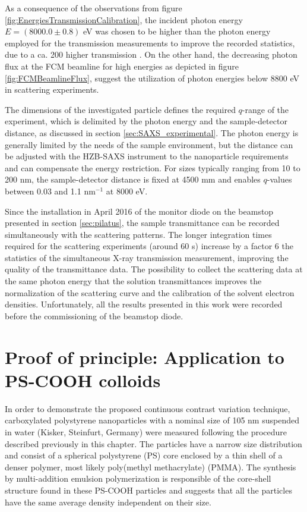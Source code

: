 As a consequence of the observations from figure \ref{fig:EnergiesTransmissionCalibration}, the incident photon energy \(E = \left(8000.0  \pm 0.8\right)\) eV was chosen to be higher than the photon energy employed for the transmission measurements to improve the recorded statistics, due to a ca. 200 higher transmission \citep{henke_x-ray_1993}. On the other hand, the decreasing photon flux at the FCM beamline for high energies as depicted in figure \ref{fig:FCMBeamlineFlux}, suggest the utilization of photon energies below 8800 eV in scattering experiments.

The dimensions of the investigated particle defines the required $q$-range of the experiment, which is delimited by the photon energy and the sample-detector distance, as discussed in section \ref{sec:SAXS_experimental}. The photon energy is generally limited by the needs of the sample environment, but the distance can be adjusted with the HZB-SAXS instrument to the nanoparticle requirements and can compensate the energy restriction. For sizes typically ranging from 10 to 200 nm, the sample-detector distance is fixed at 4500 mm and enables $q$-values between 0.03 and 1.1 nm$^{-1}$ at 8000 eV.

Since the installation in April 2016 of the monitor diode on the beamstop presented in section \ref{sec:pilatus}, the sample transmittance can be recorded simultaneously with the scattering patterns. The longer integration times required for the scattering experiments (around 60 s) increase by a factor 6 the statistics of the simultaneous X-ray transmission measurement, improving the quality of the transmittance data. The possibility to collect the scattering data at the same photon energy that the solution transmittances improves the normalization of the scattering curve and the calibration of the solvent electron densities. Unfortunately, all the results presented in this work were recorded before the commissioning of the beamstop diode.

\section{Proof of principle: Application to PS-COOH colloids}
\label{sec:KiskerResults}

In order to demonstrate the proposed continuous contrast variation technique, carboxylated polystyrene nanoparticles with a nominal size of 105 nm suspended in water (Kisker, Steinfurt, Germany) were measured following the procedure described previously in this chapter. The particles have a narrow size distribution and consist of a spherical polystyrene (PS) core enclosed by a thin shell of a denser polymer, most likely poly(methyl methacrylate) (PMMA). The synthesis by multi-addition emulsion polymerization is responsible of the core-shell structure found in these PS-COOH particles and suggests that all the particles have the same average density independent on their size.

